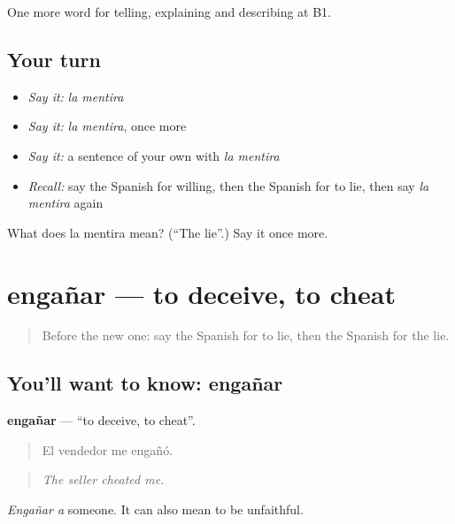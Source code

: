 \begin{grammarlens}[title={What you've built}]
One more word for telling, explaining and describing at B1.
\end{grammarlens}

\subsection*{Your turn}
\begin{itemize}
\raggedright
  \item \emph{Say it:} \emph{la mentira}
  \item \emph{Say it:} \emph{la mentira}, once more
  \item \emph{Say it:} a sentence of your own with \emph{la mentira}
  \item \emph{Recall:} say the Spanish for willing, then the Spanish for to lie, then say \emph{la mentira} again
\end{itemize}

\begin{tcolorbox}[breakable,colback=teal!4,colframe=teal!35!black,title={Before you move on}]
What does la mentira mean? (\textquotedblleft{}The lie\textquotedblright{}.) Say it once more.
\end{tcolorbox}
\section[engañar]{engañar — to deceive, to cheat}

\label{lesson:ES-C636-enganar}



\begin{quote}
Before the new one: say the Spanish for to lie, then the Spanish for the lie.
\end{quote}

\subsection*{You'll want to know: engañar}
\textbf{engañar} — \textquotedblleft{}to deceive, to cheat\textquotedblright{}.

\begin{quote}
El vendedor me engañó.
\end{quote}

\begin{quote}
\emph{The seller cheated me.}
\end{quote}

\emph{Engañar a} someone. It can also mean to be unfaithful.

